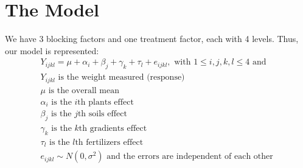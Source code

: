 \documentclass{article}
\begin{document}
\section{The Model}
\begin{center}
We have 3 blocking factors and one treatment factor, each with 4 levels. Thus, our model is represented: 
    \[ \begin{array}{c}
    Y_{ijkl} = \mu + \alpha_i + \beta _j + \gamma _k + \tau _l + e_{ijkl}, \text{ with } 1 \le i,j,k,l \le 4 \text{ and} \\ Y_{ijkl} \text{ is the weight measured (response) }\\
    \mu \text{ is the overall mean }\\
    \alpha_{i} \text{ is the } i \text{th plants effect } \\
    \beta_{j} \text{ is the } j \text{th soils effect } \\
    \gamma_{k} \text{ is the } k \text{th gradients effect } \\
    \tau_{l} \text{ is the } l \text{th fertilizers effect }  \\
    e_{ijkl} \sim N(0, \sigma^2) \text{ and the errors are independent of each other }
    \end{array}
    \]
\end{center}
\end{document}

